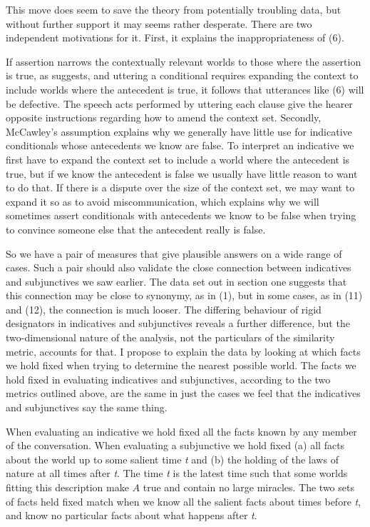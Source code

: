 This move does seem to save the theory from potentially troubling data, but without further support it may seems rather desperate. There are two independent motivations for it. First, it explains the inappropriateness of (6).


\noindent If assertion narrows the contextually relevant worlds to those where the assertion is true, as \citet{Stalnaker1978} suggests, and uttering a conditional requires expanding the context to include worlds where the antecedent is true, it follows that utterances like (6) will be defective. The speech acts performed by uttering each clause give the hearer opposite instructions regarding how to amend the context set. Secondly, McCawley's assumption explains why we generally have little use for indicative conditionals whose antecedents we know are false. To interpret an indicative we first have to expand the context set to include a world where the antecedent is true, but if we know the antecedent is false we usually have little reason to want to do that. If there is a dispute over the size of the context set, we may want to expand it so as to avoid miscommunication, which explains why we will sometimes assert conditionals with antecedents we know to be false when trying to convince someone else that the antecedent really is false.

So we have a pair of measures that give plausible answers on a wide range of cases. Such a pair should also validate the close connection between indicatives and subjunctives we saw earlier. The data set out in section one suggests that this connection may be close to synonymy, as in (1), but in some cases, as in (11) and (12), the connection is much looser. The differing behaviour of rigid designators in indicatives and subjunctives reveals a further difference, but the two-dimensional nature of the analysis, not the particulars of the similarity metric, accounts for that. I propose to explain the data by looking at which facts we hold fixed when trying to determine the nearest possible world. The facts we hold fixed in evaluating indicatives and subjunctives, according to the two metrics outlined above, are the same in just the cases we feel that the indicatives and subjunctives say the same thing.

When evaluating an indicative we hold fixed all the facts known by any member of the conversation. When evaluating a subjunctive we hold fixed (a) all facts about the world up to some salient time \textit{t} and (b) the holding of the laws of nature at all times after \textit{t}. The time \textit{t} is the latest time such that some worlds fitting this description make \(A\) true and contain no large miracles. The two sets of facts held fixed match when we know all the salient facts about times before \textit{t}, and know no particular facts about what happens after \textit{t}.

